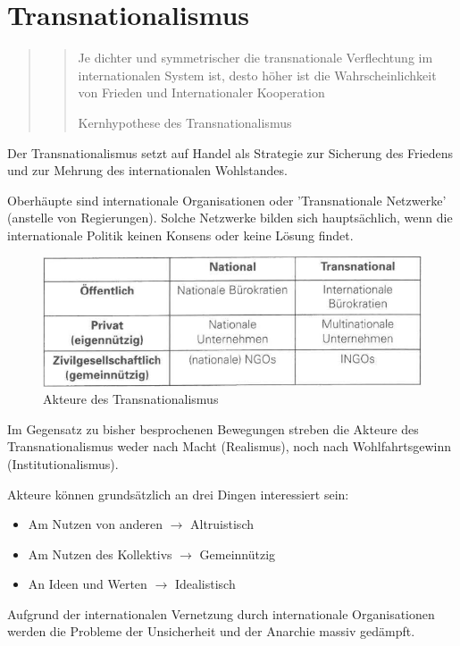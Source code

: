 \documentclass[a4paper, 11pt]{article}
\begin{document}
\section{Transnationalismus}
\begin{quote}
	\centering
	\blockquote[Kernhypothese des Transnationalismus]{Je dichter und symmetrischer die transnationale Verflechtung im internationalen System ist, desto höher ist die Wahrscheinlichkeit von Frieden und Internationaler Kooperation}
\end{quote}


Der Transnationalismus setzt auf Handel als Strategie zur Sicherung des Friedens und zur Mehrung des internationalen Wohlstandes.

Oberhäupte sind internationale Organisationen oder 'Transnationale Netzwerke' (anstelle von Regierungen). Solche Netzwerke bilden sich hauptsächlich, wenn die internationale Politik keinen Konsens oder keine Lösung findet. 

\begin{figure}[htb]
	\centering
	\includegraphics[keepaspectratio=true,height=10\baselineskip]{akteureTransnationalismus.png}
	\caption{Akteure des Transnationalismus}
	\label{fig:akteureTransnationalismus}
\end{figure}

\noindent Im Gegensatz zu bisher besprochenen Bewegungen streben die Akteure des Transnationalismus weder nach Macht (Realismus), noch nach Wohlfahrtsgewinn (Institutionalismus). 

Akteure können grundsätzlich an drei Dingen interessiert sein:

\begin{itemize}
	\item Am Nutzen von anderen $\rightarrow$ Altruistisch
	\item Am Nutzen des Kollektivs $\rightarrow$ Gemeinnützig
	\item An Ideen und Werten $\rightarrow$ Idealistisch
\end{itemize}

\noindent Aufgrund der internationalen Vernetzung durch internationale Organisationen werden die Probleme der Unsicherheit und der Anarchie massiv gedämpft.
\end{document}
